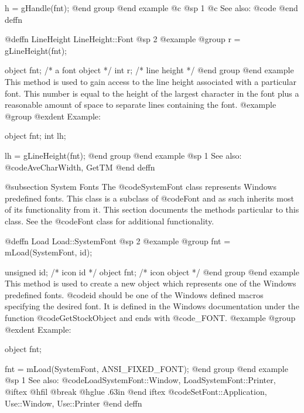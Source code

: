h = gHandle(fnt);
@end group
@end example
@c @sp 1
@c See also:  @code{}
@end deffn














@deffn {LineHeight} LineHeight::Font
@sp 2
@example
@group
r = gLineHeight(fnt);

object   fnt;  /*  a font object  */
int      r;    /*  line height    */
@end group
@end example
This method is used to gain access to the line height associated with
a particular font.  This number is equal to the height of the largest
character in the font plus a reasonable amount of space to separate
lines containing the font.
@example
@group
@exdent Example:

object  fnt;
int     lh;

lh = gLineHeight(fnt);
@end group
@end example
@sp 1
See also:  @code{AveCharWidth, GetTM}
@end deffn










@subsection System Fonts
The @code{SystemFont} class represents Windows predefined fonts.
This class is a subclass of @code{Font} and as such inherits most
of its functionality from it.  This section documents the methods
particular to this class.  See the @code{Font} class for additional
functionality.








@deffn {Load} Load::SystemFont
@sp 2
@example
@group
fnt = mLoad(SystemFont, id);

unsigned id;    /*  icon id      */
object   fnt;   /*  icon object  */
@end group
@end example
This method is used to create a new object which represents one of the
Windows predefined fonts.  @code{id} should be one of the Windows
defined macros specifying the desired font.  It is defined in the
Windows documentation under the function @code{GetStockObject} and
ends with @code{_FONT}.
@example
@group
@exdent Example:

object  fnt;

fnt = mLoad(SystemFont, ANSI_FIXED_FONT);
@end group
@end example
@sp 1
See also:  @code{LoadSystemFont::Window, LoadSystemFont::Printer,}
@iftex
@hfil @break @hglue .63in 
@end iftex
@code{SetFont::Application, Use::Window, Use::Printer}
@end deffn











